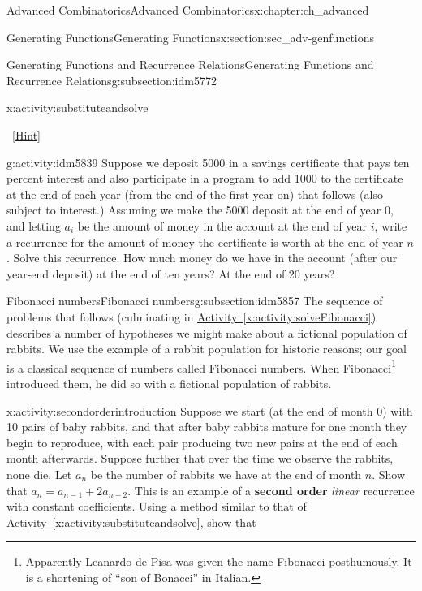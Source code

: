 \documentclass[oneside,10pt,]{book}
\newcommand{\terminology}[1]{\textbf{#1}}
\numberwithin{equation}{chapter}
\begin{document}
\begin{chapterptx}{Advanced Combinatorics}{}{Advanced Combinatorics}{}{}{x:chapter:ch_advanced}
\begin{sectionptx}{Generating Functions}{}{Generating Functions}{}{}{x:section:sec_adv-genfunctions}
\begin{subsectionptx}{Generating Functions and Recurrence Relations}{}{Generating Functions and Recurrence Relations}{}{}{g:subsection:idm5772}
\begin{activity}{}{x:activity:substituteandsolve}
\begin{enumerate}[font=\bfseries,label=(\alph*),ref=\alph*]
\qquad~\hfill{\tiny\hyperlink{g:hint:idm5820-back}{[Hint]}}\end{enumerate}
\end{activity}
\begin{activity}{}{g:activity:idm5839}%
Suppose we deposit \textdollar{}5000 in a savings certificate that pays ten percent interest and also participate in a program to add \textdollar{}1000 to the certificate at the end of each year (from the end of the first year on) that follows (also subject to interest.) Assuming we make the \textdollar{}5000 deposit at the end of year 0, and letting \(a_i\) be the amount of money in the account at the end of year \(i\), write a recurrence for the amount of money the certificate is worth at the end of year \(n\). Solve this recurrence. How much money do we have in the account (after our year-end deposit) at the end of ten years?  At the end of 20 years?%
\end{activity}
\end{subsectionptx}
%
%
\typeout{************************************************}
\typeout{************************************************}
%
\begin{subsectionptx}{Fibonacci numbers}{}{Fibonacci numbers}{}{}{g:subsection:idm5857}
The sequence of problems that follows (culminating in \hyperref[x:activity:solveFibonacci]{Activity~\ref{x:activity:solveFibonacci}}) describes a number of hypotheses we might make about a fictional population of rabbits. We use the example of a rabbit population for historic reasons; our goal is a classical sequence of numbers called Fibonacci numbers. When Fibonacci\footnote{Apparently Leanardo de Pisa was given the name Fibonacci posthumously. It is a shortening of ``son of Bonacci'' in Italian.\label{g:fn:idm5861}} introduced them, he did so with a fictional population of rabbits.%
\begin{activity}{}{x:activity:secondorderintroduction}%
Suppose we start (at the end of month 0) with 10 pairs of baby rabbits, and that after baby rabbits mature for one month they begin to reproduce, with each pair producing two new pairs at the end of each month afterwards. Suppose further that over the time we observe the rabbits, none die. Let \(a_n\) be the number of rabbits we have at the end of month \(n\). Show that \(a_n=a_{n-1} + 2a_{n-2}\). This is an example of a \terminology{second order} \emph{linear} recurrence with constant coefficients. Using a method similar to that of \hyperref[x:activity:substituteandsolve]{Activity~\ref{x:activity:substituteandsolve}}, show that%

\end{activity}
\end{subsectionptx}
\end{sectionptx}
\end{chapterptx}
\end{document}
